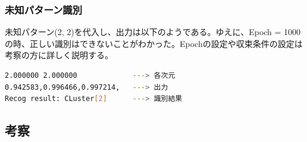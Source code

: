 \documentclass[ %
  uplatex,%
  papersize%
]{jsarticle}
\begin{document}
\subsubsection{未知パターン識別}
未知パターン(2, 2)を代入し、出力は以下のようである。ゆえに、Epoch = 1000 の時、正しい識別はできないことがわかった。Epochの設定や収束条件の設定は考察の方に詳しく説明する。
\newpage
\begin{lstlisting}[language=bash,caption=Recognition]
2.000000 2.000000             ---> 各次元
0.942583,0.996466,0.997214,   ---> 出力
Recog result: CLuster[2]      ---> 識別結果
\end{lstlisting}

\subsection{考察}
\end{document}

